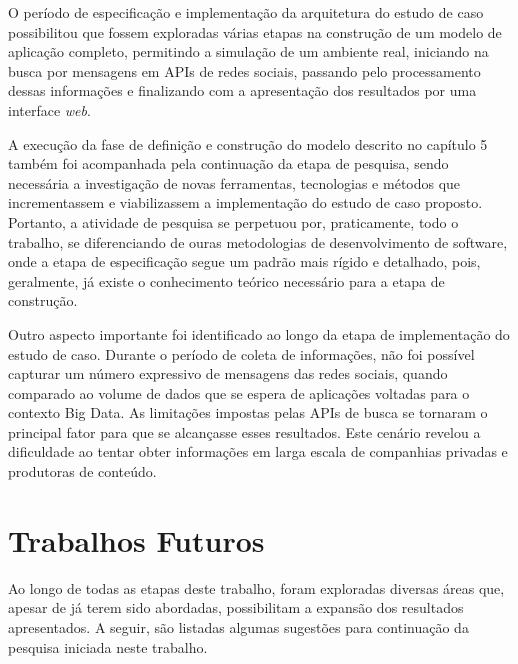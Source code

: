 O período de especificação e implementação da arquitetura do estudo de caso possibilitou que fossem exploradas várias etapas na construção de um modelo de aplicação completo, permitindo a simulação de um ambiente real, iniciando na busca por mensagens em APIs de redes sociais, passando pelo processamento dessas informações e finalizando com a apresentação dos resultados por uma interface \textit{web}.

A execução da fase de definição e construção do modelo descrito no capítulo 5 também foi acompanhada pela continuação da etapa de pesquisa, sendo necessária a investigação de novas ferramentas, tecnologias e métodos que incrementassem e viabilizassem a implementação do estudo de caso proposto. Portanto, a atividade de pesquisa se perpetuou por, praticamente, todo o trabalho, se diferenciando de ouras metodologias de desenvolvimento de software, onde a etapa de especificação segue um padrão mais rígido e detalhado, pois, geralmente, já existe o conhecimento teórico necessário para a etapa de construção.

Outro aspecto importante foi identificado ao longo da etapa de implementação do estudo de caso. Durante o período de coleta de informações, não foi possível capturar um número expressivo de mensagens das redes sociais, quando comparado ao volume de dados que se espera de aplicações voltadas para o contexto Big Data. As limitações impostas pelas APIs de busca se tornaram o principal fator para que se alcançasse esses resultados. Este cenário revelou a dificuldade ao tentar obter informações em larga escala de companhias privadas e produtoras de conteúdo.

\section{Trabalhos Futuros}

Ao longo de todas as etapas deste trabalho, foram exploradas diversas áreas que, apesar de já terem sido abordadas, possibilitam a expansão dos resultados apresentados. A seguir, são listadas algumas sugestões para continuação da pesquisa iniciada neste trabalho.

